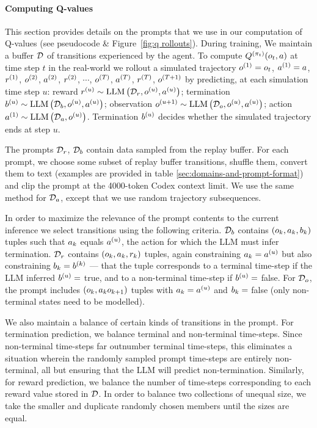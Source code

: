 \documentclass{article}
\DeclareMathOperator*{\LLM}{LLM}
\begin{document}
\paragraph{Computing Q-values}\label{para:q-values} This section provides
details on the prompts that we use in our computation of Q-values (see
 pseudocode \& Figure~\ref{fig:q rollouts}). During training, We
maintain a buffer $\mathcal{D}$ of transitions experienced by the agent. To compute
$\Q^{\Policy_t}(\Obs_t, \Act)$ at time step $t$ in the real-world we rollout a
simulated trajectory $\Obs^{1}=\Obs_t$, $\Act^{1} = \Act$, $\Rew^{1}$,
$\Obs^{2}$, $\Act^{2}$, $\Rew^{2}$, $\cdots$, $\Obs^{T}$, $\Act^{T}$,
$\Rew^{T}$, $\Obs^{T+1}$ by predicting, at each simulation time step $u$: reward
$\Rew^{u} \sim \LLM\left( \Buffer_{\Rew},\Obs^{u},\Act^{u} \right)$; termination
$\Ter^{u} \sim \LLM\left( \Buffer_{\Ter},\Obs^{u},\Act^{u} \right)$; observation
$\Obs^{u+1} \sim \LLM\left( \Buffer_{\Obs},\Obs^{u},\Act^{u} \right)$; action
$\Act^{1} \sim \LLM\left( \BestTrajectories,\Obs^{u} \right)$. Termination
$\Ter^{u}$ decides whether the simulated trajectory ends at step $u$.

The prompts $\Buffer_{\Rew}$, $\Buffer_{\Ter}$ contain data sampled from the
replay buffer. For each prompt, we choose some subset of replay buffer
transitions, shuffle them, convert them to text (examples are provided in table
\ref{sec:domains-and-prompt-format}) and clip the prompt at the 4000-token
Codex context limit. We use the same method for $\Buffer_{\Act}$, except that we
use random trajectory subsequences.


In order to maximize the relevance of the prompt contents to the current
inference we select transitions using the following criteria. $\Buffer_{\Ter}$
contains $(\Obs_k, \Act_{k}, \Ter_{k})$ tuples such that $\Act_{k}$ equals
$\Act^{u}$, the action for which the LLM must infer termination.
$\Buffer_{\Rew}$ contains $(\Obs_k, \Act_{k}, \Rew_{k})$ tuples, again
constraining  $\Act_{k} = \Act^{u}$ but also constraining $\Ter_{k} = \Ter^{k}$
--- that the tuple corresponds to a terminal time-step if the LLM inferred
$\Ter^{u} =$ true, and to a non-terminal time-step if $\Ter^{u} =$ false. For
$\Buffer_{\Obs}$, the prompt includes $(\Obs_k, \Act_{k} \Obs_{k+1})$ tuples
with $\Act_{k} = \Act^{u}$ and $\Ter_{k} =$ false (only non-terminal states need
to be modelled).

We also maintain a balance of certain kinds of transitions in the prompt. For
termination prediction, we balance terminal and non-terminal time-steps.
Since non-terminal time-steps far outnumber terminal time-steps, this
eliminates a situation wherein the randomly sampled prompt time-steps are
entirely non-terminal, all but ensuring that the LLM will predict
non-termination. Similarly, for
reward prediction, we balance the number of time-steps corresponding to each
reward value stored in $\mathcal{D}$. In order to balance two collections of
unequal size, we take the smaller and duplicate randomly chosen members
until the sizes are equal.
\end{document}
